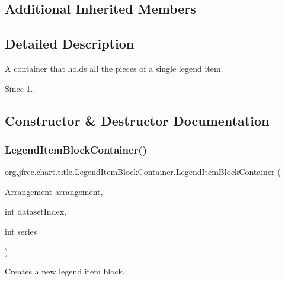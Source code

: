 \subsection*{Additional Inherited Members}


\subsection{Detailed Description}
A container that holds all the pieces of a single legend item.

\begin{DoxySince}{Since}
1.. 
\end{DoxySince}


\subsection{Constructor \& Destructor Documentation}
\mbox{\label{classorg_1_1jfree_1_1chart_1_1title_1_1_legend_item_block_container_a192e29542a7e196d784e6d9505f48094}} 
\subsubsection{\texorpdfstring{Legend\+Item\+Block\+Container()}{LegendItemBlockContainer()}\hspace{0.1cm}{\footnotesize\ttfamily [1/2]}}
{\footnotesize\ttfamily org.\+jfree.\+chart.\+title.\+Legend\+Item\+Block\+Container.\+Legend\+Item\+Block\+Container (\begin{DoxyParamCaption}\item[{\mbox{\hyperlink{interfaceorg_1_1jfree_1_1chart_1_1block_1_1_arrangement}{Arrangement}}}]{arrangement,  }\item[{int}]{dataset\+Index,  }\item[{int}]{series }\end{DoxyParamCaption})}

Creates a new legend item block.



